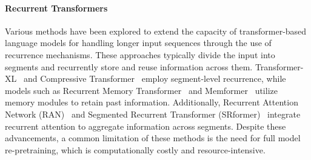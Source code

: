 


\paragraph{Recurrent Transformers}
Various methods have been explored to extend the capacity of transformer-based language models for handling longer input sequences through the use of recurrence mechanisms. These approaches typically divide the input into segments and recurrently store and reuse information across them. Transformer-XL~\cite{transformer-xl} and Compressive Transformer~\cite{compressive} employ segment-level recurrence, while models such as Recurrent Memory Transformer~\cite{rmt} and Memformer~\cite{memformer} utilize memory modules to retain past information. Additionally, Recurrent Attention Network (RAN)~\cite{RAN} and Segmented Recurrent Transformer (SRformer)~\cite{SRformer} integrate recurrent attention to aggregate information across segments. Despite these advancements, a common limitation of these methods is the need for full model re-pretraining, which is computationally costly and resource-intensive.

